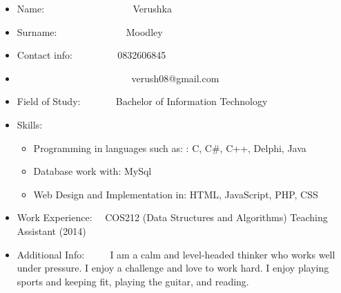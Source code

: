 \documentclass[12pt]{article}
\begin{document}
\begin{itemize}
	\item Name: \ ~~~~~~~~~~~~~~~ \ Verushka
	\item Surname: \ ~~~~~~~~~~~ \ Moodley
	\item Contact info: \ ~~~~~~ \  0832606845
	\item \ ~~~~~~~~~~~~~~~~~~~~~ \ verush08@gmail.com
	\item Field of Study: \ ~~~~ \ Bachelor of Information Technology
	\item Skills: \begin{itemize}
					\item Programming in languages such as: : C, C#, C++, Delphi, Java
					\item Database work with: MySql
					\item Web Design and Implementation in: HTML, JavaScript, PHP, CSS 
				  \end{itemize}
	\item Work Experience: \  \ COS212 (Data Structures and Algorithms) Teaching Assistant (2014)
	\item Additional Info: \ ~~ \ I am a calm and level-headed thinker who works well under pressure. I enjoy a challenge and love to work hard. I enjoy playing sports and keeping fit, playing the guitar, and reading.	
\end{itemize}
\end{document}
